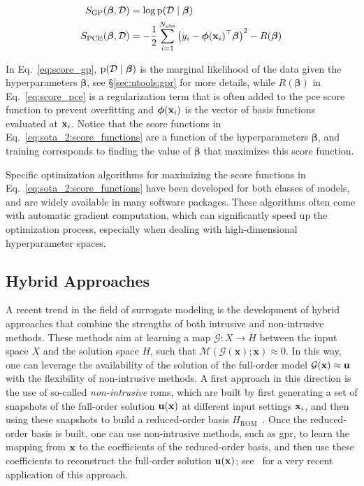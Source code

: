 \begin{subequations}
\label{eq:sota_2:score_functions}
\begin{align}
    S_\mathrm{GP}(\boldsymbol{\beta}, \mathcal{D}) &= \log \mathrm{p}(\mathcal{D} \mid \boldsymbol{\beta}) \label{eq:score_gp} \\
    S_\mathrm{PCE}(\boldsymbol{\beta}, \mathcal{D}) &= -\frac{1}{2} \sum_{i=1}^{N_{\mathrm{obs}}} \left( y_i - \boldsymbol{\phi}(\mathbf{x}_i)^{\top} \boldsymbol{\beta} \right)^2 - R(\boldsymbol{\beta}) \label{eq:score_pce}
\end{align}
\end{subequations}

In Eq.~\eqref{eq:score_gp}, $\mathrm{p}(\mathcal{D} \mid \boldsymbol{\beta})$ is the marginal likelihood of the data given the hyperparameters $\boldsymbol{\beta}$, see \S\ref{sec:ntools:gpr} for more details, while $R(\boldsymbol{\beta})$ in Eq.~\eqref{eq:score_pce} is a regularization term that is often added to the \gls{pce} score function to prevent overfitting and $\boldsymbol{\phi}(\mathbf{x}_i)$ is the vector of basis functions evaluated at $\mathbf{x}_i$. Notice that the score functions in Eq.~\eqref{eq:sota_2:score_functions} are a function of the hyperparameters $\boldsymbol{\beta}$, and training corresponds to finding the value of $\boldsymbol{\beta}$ that maximizes this score function.

\smallskip
Specific optimization algorithms for maximizing the score functions in Eq.~\eqref{eq:sota_2:score_functions} have been developed for both classes of models, and are widely available in many software packages. These algorithms often come with automatic gradient computation, which can significantly speed up the optimization process, especially when dealing with high-dimensional hyperparameter spaces. 

\smallskip
\subsection{Hybrid Approaches}

A recent trend in the field of surrogate modeling is the development of hybrid approaches that combine the strengths of both intrusive and non-intrusive methods. These methods aim at learning a map $\mathcal{G}: X \rightarrow H$ between the input space $X$ and the solution space $H$, such that $\mathcal{M}(\mathcal{G}(\mathbf{x}); \mathbf{x}) \approx 0$. In this way, one can leverage the availability of the solution of the full-order model $\mathcal{G}(\mathbf{x}) \approx \mathbf{u}$ with the flexibility of non-intrusive methods. A first approach in this direction is the use of so-called \textit{non-intrusive} \glspl{rom}, which are built by first generating a set of snapshots of the full-order solution $\mathbf{u}(\mathbf{x})$ at different input settings $\mathbf{x}_i$, and then using these snapshots to build a reduced-order basis $H_{\mathrm{ROM}}$~\cite{rom_1}. Once the reduced-order basis is built, one can use non-intrusive methods, such as \gls{gpr}, to learn the mapping from $\mathbf{x}$ to the coefficients of the reduced-order basis, and then use these coefficients to reconstruct the full-order solution $\mathbf{u}(\mathbf{x})$; see~\cite{hybrid_rom} for a very recent application of this approach.

